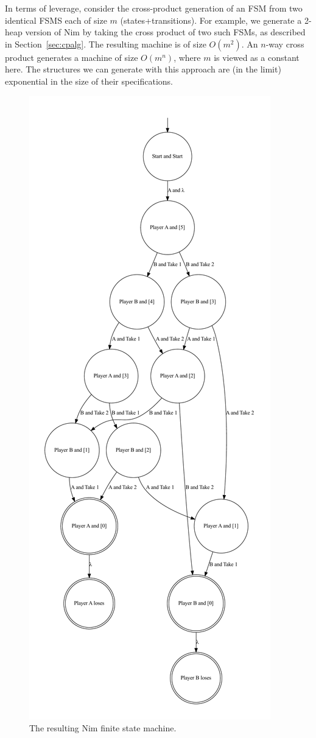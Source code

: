 \documentclass[sigplan,anonymous,review]{acmart}
\begin{document}
In terms of leverage, consider the cross-product generation of an FSM from two identical FSMS each of size $m$ (states+transitions).  For example, we generate a 2-heap version of Nim by taking the cross product of two such FSMs, as described in Section~\ref{sec:cpalg}.  The resulting machine is of size $O(m^{2})$.  An $n$-way cross product generates a machine of size $O(m^{n})$, where $m$ is viewed as a constant here.  The structures we can generate with this approach are (in the limit) exponential in the size of their specifications.

\begin{figure}
    \centering
    \includegraphics[width=0.6\linewidth]{figures/nimexample/nimFSM.pdf}
    \caption{The resulting Nim finite state machine.}
    \label{fig:nimFSM}
\end{figure}
\end{document}
